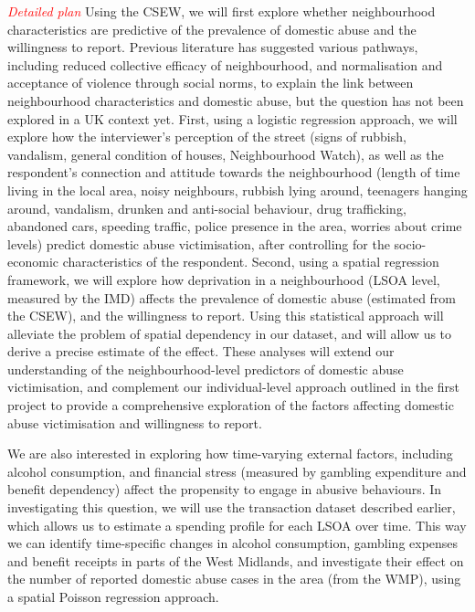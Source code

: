 \documentclass[11pt, a4paper]{article}
\begin{document}
\textcolor{red}{\textit{Detailed plan}} Using the CSEW, we will first explore whether neighbourhood characteristics are predictive of the prevalence of domestic abuse and the willingness to report. Previous literature has suggested various pathways, including reduced collective efficacy of neighbourhood, and normalisation and acceptance of violence through social norms, to explain the link between neighbourhood characteristics and domestic abuse, but the question has not been explored in a UK context yet. First, using a logistic regression approach, we will explore how the interviewer's perception of the street (signs of rubbish, vandalism, general condition of houses, Neighbourhood Watch), as well as the respondent's connection and attitude towards the neighbourhood (length of time living in the local area, noisy neighbours, rubbish lying around, teenagers hanging around, vandalism, drunken and anti-social behaviour, drug trafficking, abandoned cars, speeding traffic, police presence in the area, worries about crime levels) predict domestic abuse victimisation, after controlling for the socio-economic characteristics of the respondent. Second, using a spatial regression framework, we will explore how deprivation in a neighbourhood (LSOA level, measured by the IMD) affects the prevalence of domestic abuse (estimated from the CSEW), and the willingness to report. Using this statistical approach will alleviate the problem of spatial dependency in our dataset, and will allow us to derive a precise estimate of the effect. These analyses will extend our understanding of the neighbourhood-level predictors of domestic abuse victimisation, and complement our individual-level approach outlined in the first project to provide a comprehensive exploration of the factors affecting domestic abuse victimisation and willingness to report. 
 


We are also interested in exploring how time-varying external factors, including alcohol consumption, and financial stress (measured by gambling expenditure and benefit dependency) affect the propensity to engage in abusive behaviours. In investigating this question, we will use the transaction dataset described earlier, which allows us to estimate a spending profile for each LSOA over time. This way we can identify time-specific changes in alcohol consumption, gambling expenses and benefit receipts in parts of the West Midlands, and investigate their effect on the number of reported domestic abuse cases in the area (from the WMP), using a spatial Poisson regression approach. 
\end{document}
